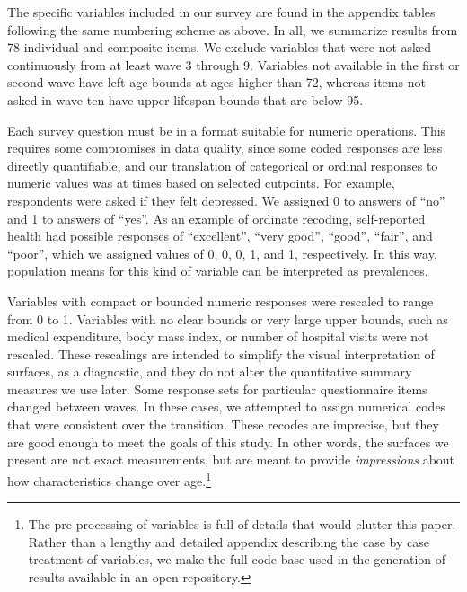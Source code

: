 \documentclass[11pt,oneside]{article} %
\begin{document}
The specific variables included in our survey are found in the appendix
tables following the same numbering scheme as above. In all, we summarize
results from 78 individual and composite items.
We exclude variables that were not asked continuously from at least wave 3 through 9. Variables not available in the
first or second wave have left age bounds at ages higher than 72, whereas items
not asked in wave ten have upper lifespan bounds that are below 95.

Each survey question must be in a format suitable for numeric operations.
This requires some compromises in data quality, since some coded responses are less directly
quantifiable, and our translation of categorical or ordinal responses to numeric
values was at times based on selected cutpoints. For example, respondents were
asked if they felt depressed. We assigned 0 to answers of ``no'' and 1 to answers of ``yes''.
As an example of ordinate recoding, self-reported health had possible responses
of ``excellent'', ``very good'', ``good'', ``fair'', and ``poor'', which we
assigned values of 0, 0, 0, 1, and 1, respectively. In this way, population
means for this kind of variable can be interpreted as prevalences.

Variables with compact or bounded numeric responses were rescaled to range from
0 to 1. Variables with no clear bounds or very large upper
bounds, such as medical expenditure, body mass index, or number of hospital
visits were not rescaled. These rescalings are intended to simplify
the visual interpretation of surfaces, as a diagnostic, and they do not alter
the quantitative summary measures we use later. Some response sets for particular questionnaire items changed between waves. In
these cases, we attempted to assign numerical codes that were consistent over the transition. These recodes are imprecise, but they are good enough to meet the goals of this study. In other words, the surfaces we present are not exact measurements, but are meant to provide
\textit{impressions} about how characteristics change over age.\footnote{The
pre-processing of variables is full of details that would clutter this paper.
Rather than a lengthy and detailed appendix describing the case by case
treatment of variables, we make the full code base used in the generation of
results available in an open repository.}

\end{document}
